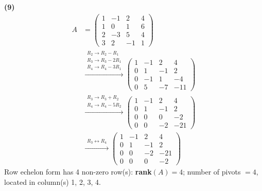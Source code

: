 \noindent\textbf{(9)}
\begin{align*}
A &= \begin{pmatrix}1 & -1 & 2 & 4 \\ 1 & 0 & 1 & 6 \\ 2 & -3 & 5 & 4 \\ 3 & 2 & -1 & 1\end{pmatrix} \\
&\xrightarrow{\substack{R_2\to R_2-R_1\\ R_3\to R_3-2R_1\\ R_4\to R_4-3R_1}} \begin{pmatrix}1 & -1 & 2 & 4 \\ 0 & 1 & -1 & 2 \\ 0 & -1 & 1 & -4 \\ 0 & 5 & -7 & -11\end{pmatrix} \\
&\xrightarrow{\substack{R_3\to R_3+R_2\\ R_4\to R_4-5R_2}} \begin{pmatrix}1 & -1 & 2 & 4 \\ 0 & 1 & -1 & 2 \\ 0 & 0 & 0 & -2 \\ 0 & 0 & -2 & -21\end{pmatrix} \\
&\xrightarrow{\substack{R_3\leftrightarrow R_4}} \begin{pmatrix}1 & -1 & 2 & 4 \\ 0 & 1 & -1 & 2 \\ 0 & 0 & -2 & -21 \\ 0 & 0 & 0 & -2\end{pmatrix}
\end{align*}
Row echelon form has 4 non-zero row(s): \textbf{rank}$(A)=4$; number of pivots $=4$, located in column(s) 1, 2, 3, 4.


